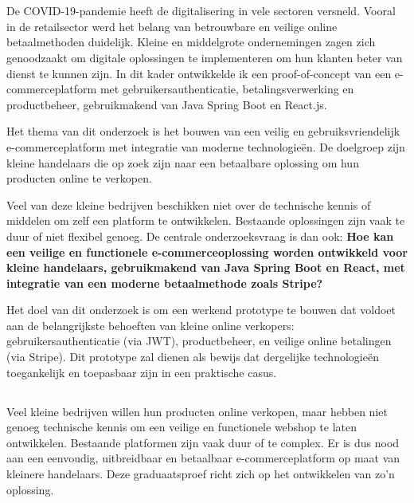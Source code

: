 
\chapter{}%
\label{ch:inleiding}
De COVID-19-pandemie heeft de digitalisering in vele sectoren versneld. Vooral in de retailsector werd het belang van betrouwbare en veilige online betaalmethoden duidelijk. Kleine en middelgrote ondernemingen zagen zich genoodzaakt om digitale oplossingen te implementeren om hun klanten beter van dienst te kunnen zijn. In dit kader ontwikkelde ik een proof-of-concept van een e-commerceplatform met gebruikersauthenticatie, betalingsverwerking en productbeheer, gebruikmakend van Java Spring Boot en React.js.

Het thema van dit onderzoek is het bouwen van een veilig en gebruiksvriendelijk e-commerceplatform met integratie van moderne technologieën. De doelgroep zijn kleine handelaars die op zoek zijn naar een betaalbare oplossing om hun producten online te verkopen.

Veel van deze kleine bedrijven beschikken niet over de technische kennis of middelen om zelf een platform te ontwikkelen. Bestaande oplossingen zijn vaak te duur of niet flexibel genoeg. De centrale onderzoeksvraag is dan ook: \textbf{Hoe kan een veilige en functionele e-commerceoplossing worden ontwikkeld voor kleine handelaars, gebruikmakend van Java Spring Boot en React, met integratie van een moderne betaalmethode zoals Stripe?}

Het doel van dit onderzoek is om een werkend prototype te bouwen dat voldoet aan de belangrijkste behoeften van kleine online verkopers: gebruikersauthenticatie (via JWT), productbeheer, en veilige online betalingen (via Stripe). Dit prototype zal dienen als bewijs dat dergelijke technologieën toegankelijk en toepasbaar zijn in een praktische casus.



\section{}%
\label{sec:probleemstelling}
Veel kleine bedrijven willen hun producten online verkopen, maar hebben niet genoeg technische kennis om een veilige en functionele webshop te laten ontwikkelen. Bestaande platformen zijn vaak duur of te complex. Er is dus nood aan een eenvoudig, uitbreidbaar en betaalbaar e-commerceplatform op maat van kleinere handelaars. Deze graduaatsproef richt zich op het ontwikkelen van zo’n oplossing.



